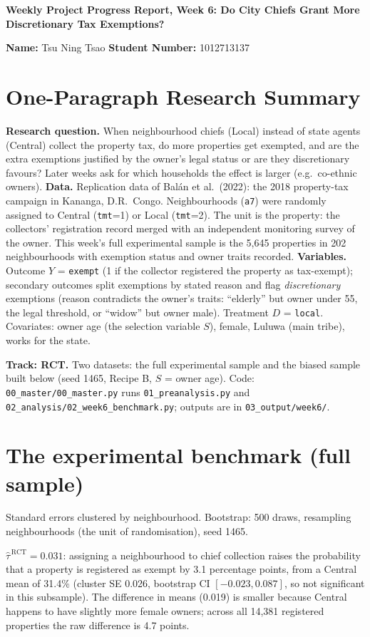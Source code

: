 \documentclass[11pt]{article}
\newcommand{\taurct}{\hat\tau^{\,\mathrm{RCT}}}
\begin{document}
{\Large\bfseries Weekly Project Progress Report, Week 6: Do City Chiefs Grant More Discretionary Tax Exemptions?}

\vspace{2pt}
\textbf{Name:} Tsu Ning Tsao \quad \textbf{Student Number:} 1012713137

\section*{One-Paragraph Research Summary}
\textbf{Research question.} When neighbourhood chiefs (Local) instead of state agents (Central) collect the property tax, do more properties get exempted, and are the extra exemptions justified by the owner's legal status or are they discretionary favours? Later weeks ask for which households the effect is larger (e.g.\ co-ethnic owners). \textbf{Data.} Replication data of Bal\'an et al.\ (2022): the 2018 property-tax campaign in Kananga, D.R.\ Congo. Neighbourhoods (\texttt{a7}) were randomly assigned to Central (\texttt{tmt}=1) or Local (\texttt{tmt}=2). The unit is the property: the collectors' registration record merged with an independent monitoring survey of the owner. This week's full experimental sample is the 5,645 properties in 202 neighbourhoods with exemption status and owner traits recorded. \textbf{Variables.} Outcome $Y$ = \texttt{exempt} (1 if the collector registered the property as tax-exempt); secondary outcomes split exemptions by stated reason and flag \emph{discretionary} exemptions (reason contradicts the owner's traits: ``elderly'' but owner under 55, the legal threshold, or ``widow'' but owner male). Treatment $D$ = \texttt{local}. Covariates: owner age (the selection variable $S$), female, Luluwa (main tribe), works for the state.

\textbf{Track: RCT.} Two datasets: the full experimental sample and the biased sample built below (seed 1465, Recipe B, $S$ = owner age). Code: \texttt{00\_master/00\_master.py} runs \texttt{01\_preanalysis.py} and \texttt{02\_analysis/02\_week6\_benchmark.py}; outputs are in \texttt{03\_output/week6/}.

\section{The experimental benchmark (full sample)}
\begin{table}[H]\centering\small
\caption{Treatment effect of Local on \texttt{exempt}. Rows 1--2: full experimental sample; rows 3--6: biased sample.}

\par\smallskip\footnotesize Standard errors clustered by neighbourhood. Bootstrap: 500 draws, resampling neighbourhoods (the unit of randomisation), seed 1465.
\end{table}
$\taurct = 0.031$: assigning a neighbourhood to chief collection raises the probability that a property is registered as exempt by 3.1 percentage points, from a Central mean of 31.4\% (cluster SE 0.026, bootstrap CI $[-0.023, 0.087]$, so not significant in this subsample). The difference in means (0.019) is smaller because Central happens to have slightly more female owners; across all 14,381 registered properties the raw difference is 4.7 points.
\end{document}
